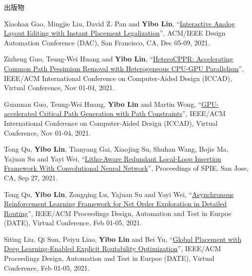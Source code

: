 \begin{rSection}{出版物}
\begin{description}[font=\normalfont]
{}
            

\item[{[C51]}]{
        Xiaohan Gao, Mingjie Liu, David Z. Pan and \textbf{Yibo Lin}, 
    ``\href{https://doi.org/10.1109/DAC18074.2021.9586234}{Interactive Analog Layout Editing with Instant Placement Legalization}'', 
    ACM/IEEE Design Automation Conference (DAC), San Francisco, CA, Dec 05-09, 2021.
    
}
            

\item[{[C50]}]{
        Zizheng Guo, Tsung-Wei Huang and \textbf{Yibo Lin}, 
    ``\href{https://doi.org/10.1109/ICCAD51958.2021.9643457}{HeteroCPPR: Accelerating Common Path Pessimism Removal with Heterogeneous CPU-GPU Parallelism}'', 
    IEEE/ACM International Conference on Computer-Aided Design (ICCAD), Virtual Conference, Nov 01-04, 2021.
    
}
            

\item[{[C49]}]{
        Guannan Guo, Tsung-Wei Huang, \textbf{Yibo Lin} and Martin Wong, 
    ``\href{https://doi.org/10.1109/ICCAD51958.2021.9643504}{GPU-accelerated Critical Path Generation with Path Constraints}'', 
    IEEE/ACM International Conference on Computer-Aided Design (ICCAD), Virtual Conference, Nov 01-04, 2021.
    
}
            

\item[{[C48]}]{
        Tong Qu, \textbf{Yibo Lin}, Tianyang Gai, Xiaojing Su, Shuhan Wang, Bojie Ma, Yajuan Su and Yayi Wei, 
    ``\href{https://doi.org/10.1117/12.2601685}{Litho-Aware Redundant Local-Loop Insertion Framework With Convolutional Neural Network}'', 
    Proceedings of SPIE, San Jose, CA, Sep 27, 2021.
    
}
            

\item[{[C47]}]{
        Tong Qu, \textbf{Yibo Lin}, Zongqing Lu, Yajuan Su and Yayi Wei, 
    ``\href{https://doi.org/10.23919/DATE51398.2021.9474007}{Asynchronous Reinforcement Learning Framework for Net Order Exploration in Detailed Routing}'', 
    IEEE/ACM Proceedings Design, Automation and Test in Eurpoe (DATE), Virtual Conference, Feb 01-05, 2021.
    
}
            

\item[{[C46]}]{
        Siting Liu, Qi Sun, Peiyu Liao, \textbf{Yibo Lin} and Bei Yu, 
    ``\href{https://doi.org/10.23919/DATE51398.2021.9473959}{Global Placement with Deep Learning-Enabled Explicit Routability Optimization}'', 
    IEEE/ACM Proceedings Design, Automation and Test in Eurpoe (DATE), Virtual Conference, Feb 01-05, 2021.
    
}
\end{description}
\end{rSection}
